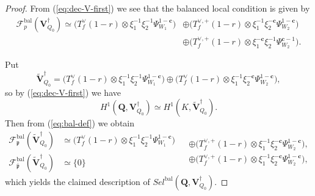 \documentclass[10pt,a4paper]{amsart}
\DeclareMathOperator{\bal}{\mathrm{bal}}
\newcommand{\Q}{\mathbf{Q}}
\newcommand{\Sel}{Sel}
\newcommand{\Vsdag}{{\mathbf{V}_{Q_0}^\dagger}}
\newcommand{\cc}{\mathbf{c}}
\newcommand{\ch}{\xi}
\newcommand{\ppbar}{\bar{\mathfrak{p}}}
\newcommand{\pp}{\mathfrak{p}}
\newcommand{\rH}{H}
\begin{document}
\begin{proof}
From (\ref{eq:dec-V-first}) we see that the balanced local condition is given by
\begin{equation}\label{eq:bal-def}
\begin{aligned}
\mathscr{F}^{\bal}_p(\Vsdag)
\simeq\bigl(T_f^{\vee}(1-r)\otimes\ch_1^{-1}\ch_2^{-1}\Psi_{W_1}^{1-\cc}\bigr)&\oplus\bigl(T_f^{\vee,+}(1-r)\otimes\ch_1^{-1}\ch_2^{-\cc}\Psi_{W_2}^{1-\cc}\bigr)\\
&\oplus\bigl(T_f^{\vee,+}(1-r)\otimes\ch_1^{-\cc}\ch_2^{-1}\Psi_{W_2}^{\cc-1}\bigr).
\end{aligned}
\end{equation}






Put \[\widetilde{\mathbf{V}}_{Q_0}^\dagger=\bigl(T_f^{\vee}(1-r)\otimes\ch_1^{-1}\ch_2^{-1}\Psi_{W_1}^{1-\cc}\bigr)\oplus\bigl(T_f^{\vee}(1-r)\otimes\ch_1^{-1}\ch_2^{-\cc}\Psi_{W_2}^{1-\cc}\bigr),\]
so by (\ref{eq:dec-V-first}) we have
\begin{equation}\label{eq:shapiro-bis}
\rH^1(\Q,\mathbf{V}_{Q_0}^\dagger)\simeq\rH^1(K,\widetilde{\mathbf{V}}_{Q_0}^\dagger).
\end{equation}
Then from (\ref{eq:bal-def}) we obtain
\begin{equation}\label{eq:bal-shapiro}
\begin{split}
\mathscr{F}^{\bal}_\pp(\widetilde{\mathbf{V}}_{Q_0}^\dagger)&\simeq\bigl(T_f^{\vee}(1-r)\otimes\ch_1^{-1}\ch_2^{-1}\Psi_{W_1}^{1-\cc}\bigr)\\
\mathscr{F}^{\bal}_{\ppbar}(\widetilde{\mathbf{V}}_{Q_0}^\dagger)&\simeq\{0\}
\end{split}
\begin{split}
&\oplus\bigl(T_f^{\vee,+}(1-r)\otimes\ch_1^{-1}\ch_2^{-\cc}\Psi_{W_2}^{1-\cc}\bigr),\\
&\oplus \bigl( T_f^{\vee,+}(1-r)\otimes\ch_1^{-1}\ch_2^{-\cc}\Psi_{W_2}^{1-\cc}\bigr),\nonumber
\end{split}
\end{equation}
%
which yields the claimed description of $\Sel^{\bal}(\Q,\Vsdag)$. 


\end{proof}
\end{document}
